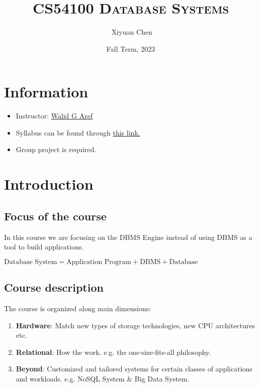 \documentclass{ainote}
\author{\ccLogo \,\,Xiyuan Chen}
\title{\textsc{CS54100 
Database Systems}}
\date{Fall Term, 2023}
\begin{document}
\maketitle
\doclicenseThis
\section*{Information}
\begin{itemize}
        \item Instructor: \href{https://www.cs.purdue.edu/homes/aref/}{Walid G Aref}
	\item Syllabus can be found through \href{https://purdue.brightspace.com/d2l/le/content/832018/Home}{this link. }
	\item Group project is required. 
\end{itemize}
\tableofcontents
\newpage

\section{Introduction}
\subsection{Focus of the course}
In this course we are focusing on the DBMS Engine instead of using DBMS as a tool to build applications.
\begin{info}
    $\text{Database System}=\text{Application Program}+\text{DBMS}+\text{Database}$
\end{info}

\subsection{Course description}
The course is organized along  main dimensions:
\begin{enumerate}
    \item \textbf{Hardware}: Match new types of storage technologies, new CPU architectures etc.
    \item \textbf{Relational}: How the  work. e.g. the one-size-fits-all philosophy.
    \item \textbf{Beyond}: Customized and tailored systems for certain classes of applications and workloads. e.g. NoSQL System \& Big Data System.
\end{enumerate}
\end{document}
